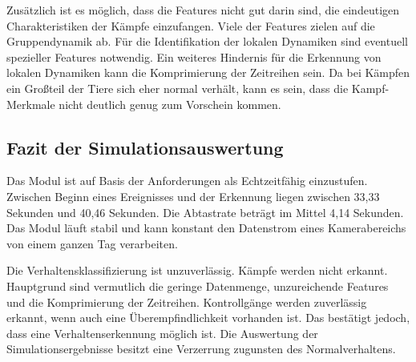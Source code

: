 Zusätzlich ist es möglich, dass die Features nicht gut darin sind, die eindeutigen Charakteristiken der Kämpfe einzufangen. Viele der Features zielen auf die Gruppendynamik ab. Für die Identifikation der lokalen Dynamiken sind eventuell spezieller Features notwendig. Ein weiteres Hindernis für die Erkennung von lokalen Dynamiken kann die Komprimierung der Zeitreihen sein. Da bei Kämpfen ein Großteil der Tiere sich eher normal verhält, kann es sein, dass die Kampf-Merkmale nicht deutlich genug zum Vorschein kommen. \par


\subsection{Fazit der Simulationsauswertung}
Das Modul ist auf Basis der Anforderungen als Echtzeitfähig einzustufen. Zwischen Beginn eines Ereignisses und der Erkennung liegen zwischen 33,33 Sekunden und 40,46 Sekunden. Die Abtastrate beträgt im Mittel 4,14 Sekunden. Das Modul läuft stabil und kann konstant den Datenstrom eines Kamerabereichs von einem ganzen Tag verarbeiten. \par

Die Verhaltensklassifizierung ist unzuverlässig. Kämpfe werden nicht erkannt. Hauptgrund sind vermutlich die geringe Datenmenge, unzureichende Features und die Komprimierung der Zeitreihen. Kontrollgänge werden zuverlässig erkannt, wenn auch eine Überempfindlichkeit vorhanden ist. Das bestätigt jedoch, dass eine Verhaltenserkennung möglich ist. Die Auswertung der Simulationsergebnisse besitzt eine Verzerrung zugunsten des Normalverhaltens. 